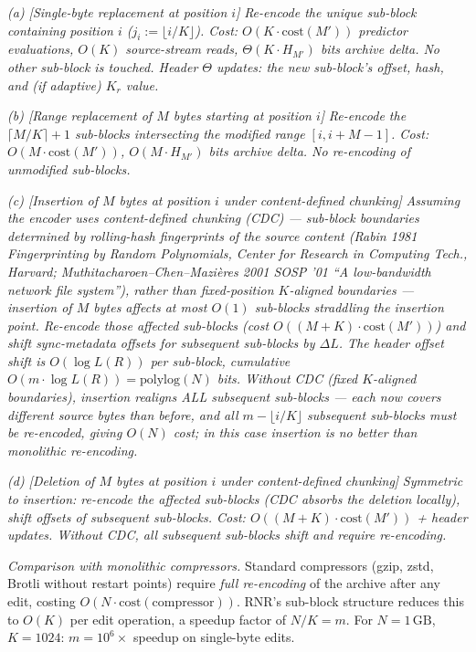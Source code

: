 \documentclass[
]{article}
\begin{document}
\emph{(a) [Single-byte replacement at position $i$]} \emph{Re-encode
the unique sub-block containing position $i$ ($j_i := \lfloor i/K
\rfloor$). Cost: $O(K \cdot \mathrm{cost}(M'))$ predictor evaluations,
$O(K)$ source-stream reads, $\Theta(K \cdot H_{M'})$ bits archive
delta. No other sub-block is touched. Header $\Theta$ updates: the
new sub-block's offset, hash, and (if adaptive) $K_r$ value.}

\emph{(b) [Range replacement of $M$ bytes starting at position $i$]}
\emph{Re-encode the $\lceil M/K \rceil + 1$ sub-blocks intersecting
the modified range $[i, i+M-1]$. Cost: $O(M \cdot \mathrm{cost}(M'))$,
$O(M \cdot H_{M'})$ bits archive delta. No re-encoding of unmodified
sub-blocks.}

\emph{(c) [Insertion of $M$ bytes at position $i$ under content-defined
chunking]} \emph{Assuming the encoder uses \emph{content-defined
chunking} (CDC) --- sub-block boundaries determined by rolling-hash
fingerprints of the source content (Rabin 1981 \emph{Fingerprinting by
Random Polynomials}, Center for Research in Computing Tech., Harvard;
Muthitacharoen--Chen--Mazi{\`e}res 2001 \emph{SOSP '01} ``A low-bandwidth
network file system''), rather than fixed-position $K$-aligned
boundaries --- insertion of $M$ bytes affects at most $O(1)$
sub-blocks straddling the insertion point. Re-encode those affected
sub-blocks (cost $O((M+K) \cdot \mathrm{cost}(M'))$) and shift
sync-metadata offsets for subsequent sub-blocks by $\Delta L$. The
header offset shift is $O(\log L(R))$ per sub-block, cumulative
$O(m \cdot \log L(R)) = \mathrm{polylog}(N)$ bits. \emph{Without CDC}
(fixed $K$-aligned boundaries), insertion realigns ALL subsequent
sub-blocks --- each now covers different source bytes than before, and
all $m - \lfloor i/K \rfloor$ subsequent sub-blocks must be re-encoded,
giving $O(N)$ cost; in this case insertion is no better than monolithic
re-encoding.}

\emph{(d) [Deletion of $M$ bytes at position $i$ under content-defined
chunking]} \emph{Symmetric to insertion: re-encode the affected
sub-blocks (CDC absorbs the deletion locally), shift offsets of
subsequent sub-blocks. Cost: $O((M+K) \cdot \mathrm{cost}(M'))$ +
header updates. Without CDC, all subsequent sub-blocks shift and
require re-encoding.}

\emph{Comparison with monolithic compressors.} Standard compressors
(gzip, zstd, Brotli without restart points) require \emph{full
re-encoding} of the archive after any edit, costing
$O(N \cdot \mathrm{cost}(\text{compressor}))$. RNR's sub-block
structure reduces this to $O(K)$ per edit operation, a speedup factor
of $N/K = m$. For $N = 1\,\mathrm{GB}$, $K = 1024$: $m = 10^6\times$
speedup on single-byte edits.
\end{document}
